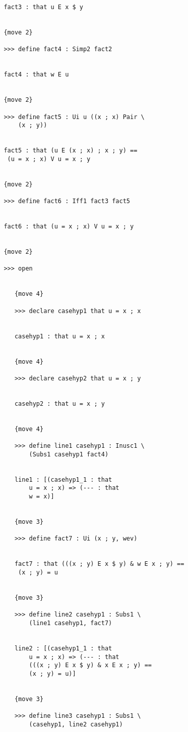 \documentclass[12pt]{article}
\begin{document}
\begin{verbatim}
         fact3 : that u E x $ y


         {move 2}

         >>> define fact4 : Simp2 fact2


         fact4 : that w E u


         {move 2}

         >>> define fact5 : Ui u ((x ; x) Pair \
             (x ; y))


         fact5 : that (u E (x ; x) ; x ; y) == 
          (u = x ; x) V u = x ; y


         {move 2}

         >>> define fact6 : Iff1 fact3 fact5


         fact6 : that (u = x ; x) V u = x ; y


         {move 2}

         >>> open


            {move 4}

            >>> declare casehyp1 that u = x ; x


            casehyp1 : that u = x ; x


            {move 4}

            >>> declare casehyp2 that u = x ; y


            casehyp2 : that u = x ; y


            {move 4}

            >>> define line1 casehyp1 : Inusc1 \
                (Subs1 casehyp1 fact4)


            line1 : [(casehyp1_1 : that 
                u = x ; x) => (--- : that 
                w = x)]


            {move 3}

            >>> define fact7 : Ui (x ; y, wev)


            fact7 : that (((x ; y) E x $ y) & w E x ; y) == 
             (x ; y) = u


            {move 3}

            >>> define line2 casehyp1 : Subs1 \
                (line1 casehyp1, fact7)


            line2 : [(casehyp1_1 : that 
                u = x ; x) => (--- : that 
                (((x ; y) E x $ y) & x E x ; y) == 
                (x ; y) = u)]


            {move 3}

            >>> define line3 casehyp1 : Subs1 \
                (casehyp1, line2 casehyp1)



\end{verbatim}
\end{document}
